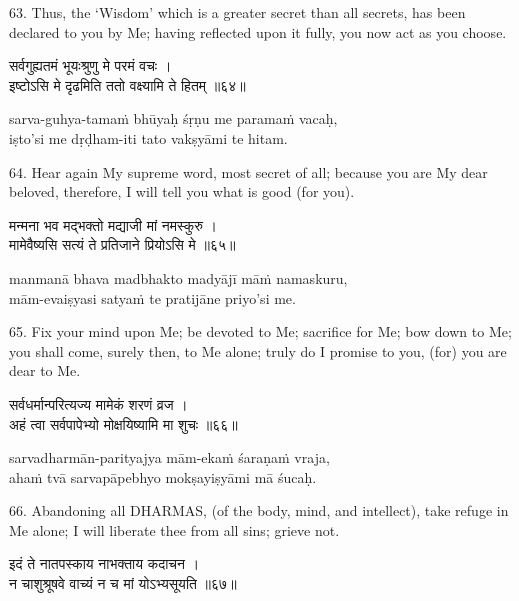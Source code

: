 63. Thus, the `Wisdom' which is a greater secret than all secrets, has been
declared to you by Me; having reflected upon it fully, you now act as you
choose.

\begin{gitaverse}
सर्वगुह्यतमं भूयःश्रुणु मे परमं वचः । \\
इष्टोऽसि मे दृढमिति ततो वक्ष्यामि ते हितम् ॥६४॥
\end{gitaverse}

\begin{transliteration}
sarva-guhya-tamaṁ bhūyaḥ śṛṇu me paramaṁ vacaḥ, \\
iṣto'si me dṛḍham-iti tato vakṣyāmi te hitam.
\end{transliteration}

64. Hear again My supreme word, most secret of all; because you are My dear
beloved, therefore, I will tell you what is good (for you).

\begin{gitaverse}
मन्मना भव मद्भक्तो मद्याजी मां नमस्कुरु । \\
मामेवैष्यसि सत्यं ते प्रतिजाने प्रियोऽसि मे ॥६५॥
\end{gitaverse}

\begin{transliteration}
manmanā bhava madbhakto madyājī māṁ namaskuru, \\
mām-evaiṣyasi satyaṁ te pratijāne priyo'si me.
\end{transliteration}

65. Fix your mind upon Me; be devoted to Me; sacrifice for Me; bow down to Me;
you shall come, surely then, to Me alone; truly do I promise to you, (for) you
are dear to Me.

\begin{gitaverse}
सर्वधर्मान्परित्यज्य मामेकं शरणं व्रज । \\
अहं त्वा सर्वपापेभ्यो मोक्षयिष्यामि मा शुचः ॥६६॥
\end{gitaverse}

\begin{transliteration}
sarvadharmān-parityajya mām-ekaṁ śaraṇaṁ vraja, \\
ahaṁ tvā sarvapāpebhyo mokṣayiṣyāmi mā śucaḥ.
\end{transliteration}

66. Abandoning all DHARMAS, (of the body, mind, and intellect), take refuge in
Me alone; I will liberate thee from all sins; grieve not.

\begin{gitaverse}
इदं ते नातपस्काय नाभक्ताय कदाचन । \\
न चाशुश्रूषवे वाच्यं न च मां योऽभ्यसूयति ॥६७॥
\end{gitaverse}

